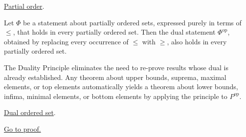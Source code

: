 \begin{remark*}[Dependencies]
\hyperref[def:lattice-order-partial-order]{Partial order}.
\end{remark*}


\begin{proposition}
\label{prop:duality-principle}
Let $\Phi$ be a statement about partially ordered sets, expressed purely
in terms of $\leq$, that holds in every partially ordered set.  Then the
dual statement $\Phi^{\mathrm{op}}$, obtained by replacing every
occurrence of $\leq$ with $\geq$, also holds in every partially ordered
set.
\end{proposition}

\begin{remark*}[Interpretation]
The Duality Principle eliminates the need to re-prove results whose dual
is already established.  Any theorem about upper bounds, suprema, maximal
elements, or top elements automatically yields a theorem about lower
bounds, infima, minimal elements, or bottom elements by applying the
principle to $P^{\mathrm{op}}$.
\end{remark*}

\begin{remark*}[Dependencies]
\hyperref[def:dual-ordered-set]{Dual ordered set}.
\end{remark*}

\begin{remark*}[Proof]
\hyperref[prf:duality-principle]{Go to proof.}
\end{remark*}
